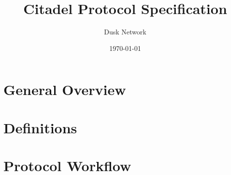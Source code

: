 \documentclass[10pt]{article}
\title{Citadel Protocol Specification}
\date{\today}
\author{Dusk Network}
\newcounter{protocol}
\begin{document}
\maketitle

\tableofcontents
\pagebreak 

\section{General Overview}
\label{sec:overview}


\section{Definitions}
\label{sec:definitions}


\section{Protocol Workflow}
\label{sec:protocol}

\end{document}
